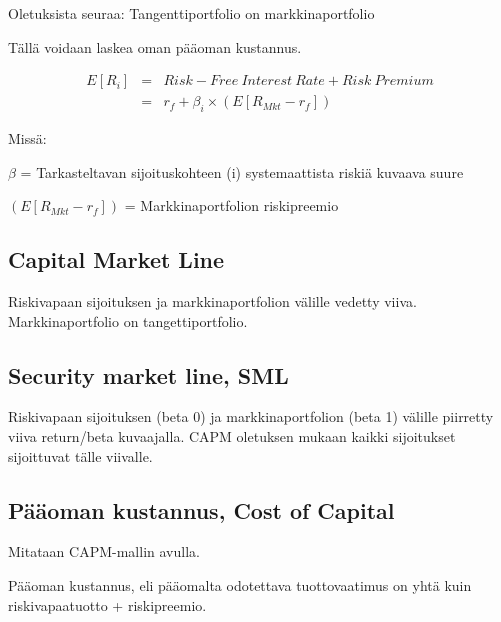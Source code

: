 \documentclass[a4paper]{article}
\begin{document}
Oletuksista seuraa: Tangenttiportfolio on markkinaportfolio

Tällä voidaan laskea oman pääoman kustannus.

\[
\begin{array}{lcl}
E[R_i] & = & Risk-Free\ Interest\ Rate + Risk\ Premium \\
 & = & r_f + \beta_i \times ( E [R_{Mkt} - r_f] )
\end{array}
\]

Missä:

$\beta$ = Tarkasteltavan sijoituskohteen (i) systemaattista riskiä kuvaava suure

$( E [R_{Mkt} - r_f] )$ = Markkinaportfolion riskipreemio

\subsection{Capital Market Line}

Riskivapaan sijoituksen ja markkinaportfolion välille vedetty viiva. Markkinaportfolio on tangettiportfolio.

\subsection{Security market line, SML}

Riskivapaan sijoituksen (beta 0) ja markkinaportfolion (beta 1) välille piirretty viiva return/beta kuvaajalla. CAPM oletuksen mukaan kaikki sijoitukset sijoittuvat tälle viivalle.

\subsection{Pääoman kustannus, Cost of Capital}

Mitataan CAPM-mallin avulla. 

Pääoman kustannus, eli pääomalta odotettava tuottovaatimus on yhtä kuin riskivapaatuotto + riskipreemio.
\end{document}
